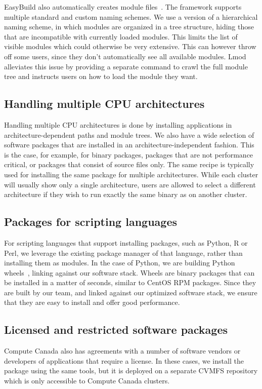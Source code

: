 \documentclass[sigconf]{acmart}
\begin{document}
EasyBuild also automatically creates module files~\cite{Modules1991,Modules1996,Lmod}. The framework supports multiple standard and custom naming schemes. We use a version of a hierarchical naming scheme, in which modules are organized in a tree structure, hiding those that are incompatible with currently loaded modules. This limits the list of visible modules which could otherwise be very extensive. This can however throw off some users, since they don’t automatically see all available modules. Lmod~\cite{Lmod} alleviates this issue by providing a separate command to crawl the full module tree and instructs users on how to load the module they want.

\subsection{Handling multiple CPU architectures}
\label{sub:Handling_multiple_CPU_architectures}
Handling multiple CPU architectures is done by installing applications in architecture-dependent paths and module trees. We also have a wide selection of software packages that are installed in an architecture-independent fashion. This is the case, for example, for binary packages, packages that are not performance critical, or packages that consist of source files only. The same recipe is typically used for installing the same package for multiple architectures. While each cluster will usually show only a single architecture, users are allowed to select a different architecture if they wish to run exactly the same binary as on another cluster.

\subsection{Packages for scripting languages}
\label{sub:Packages_for_scripting_languages}
For scripting languages that support installing packages, such as Python, R or Perl, we leverage the existing package manager of that language, rather than installing them as modules. In the case of Python, we are building Python wheels~\cite{Wheels}, linking against our software stack. Wheels are binary packages that can be installed in a matter of seconds, similar to CentOS RPM packages. Since they are built by our team, and linked against our optimized software stack, we ensure that they are easy to install and offer good performance.

\subsection{Licensed and restricted software packages}
\label{sub:Licensed_software_packages}
Compute Canada also has agreements with a number of software vendors or developers of applications that require a license. In these cases, we install the package using the same tools, but it is deployed on a separate CVMFS repository which is only accessible to Compute Canada clusters.
\end{document}
